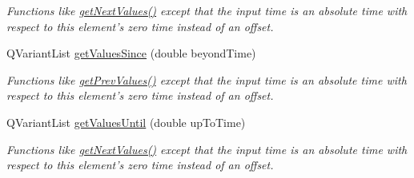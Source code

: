 \begin{DoxyCompactItemize}
\begin{DoxyCompactList}\small\item\em Functions like \hyperlink{class_picto_1_1_analysis_signal_data_ae3340eeed23a62f60a2e51e324c69def}{get\-Next\-Values()} except that the input time is an absolute time with respect to this element's zero time instead of an offset. \end{DoxyCompactList}\item 
\hypertarget{class_picto_1_1_analysis_signal_data_a4280103b70f28f59ecefec25682d6104}{Q\-Variant\-List \hyperlink{class_picto_1_1_analysis_signal_data_a4280103b70f28f59ecefec25682d6104}{get\-Values\-Since} (double beyond\-Time)}\label{class_picto_1_1_analysis_signal_data_a4280103b70f28f59ecefec25682d6104}

\begin{DoxyCompactList}\small\item\em Functions like \hyperlink{class_picto_1_1_analysis_signal_data_a5531db7f4dffd88f6a95feb3d5e093e9}{get\-Prev\-Values()} except that the input time is an absolute time with respect to this element's zero time instead of an offset. \end{DoxyCompactList}\item 
\hypertarget{class_picto_1_1_analysis_signal_data_adb0f20fab12d57483f45dd4e7a3ec261}{Q\-Variant\-List \hyperlink{class_picto_1_1_analysis_signal_data_adb0f20fab12d57483f45dd4e7a3ec261}{get\-Values\-Until} (double up\-To\-Time)}\label{class_picto_1_1_analysis_signal_data_adb0f20fab12d57483f45dd4e7a3ec261}

\begin{DoxyCompactList}\small\item\em Functions like \hyperlink{class_picto_1_1_analysis_signal_data_ae3340eeed23a62f60a2e51e324c69def}{get\-Next\-Values()} except that the input time is an absolute time with respect to this element's zero time instead of an offset. \end{DoxyCompactList}\end{DoxyCompactItemize}
